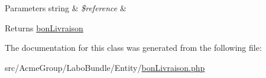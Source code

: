 \begin{DoxyParams}[1]{Parameters}
string & {\em \$reference} & \\
\hline
\end{DoxyParams}
\begin{DoxyReturn}{Returns}
\hyperlink{class_acme_group_1_1_labo_bundle_1_1_entity_1_1bon_livraison}{bon\+Livraison} 
\end{DoxyReturn}


The documentation for this class was generated from the following file\+:\begin{DoxyCompactItemize}
\item 
src/\+Acme\+Group/\+Labo\+Bundle/\+Entity/\hyperlink{bon_livraison_8php}{bon\+Livraison.\+php}\end{DoxyCompactItemize}
